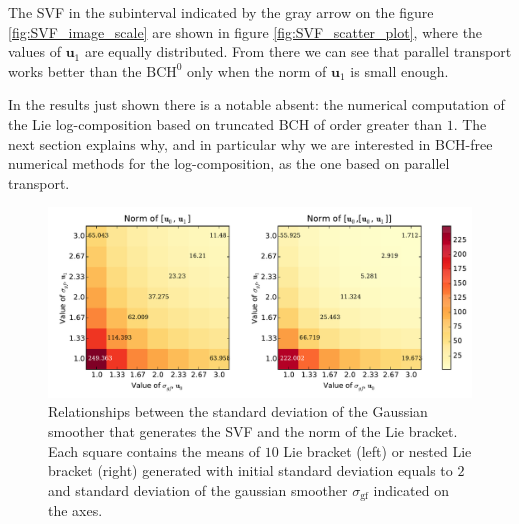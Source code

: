The SVF in the subinterval indicated by the gray arrow on the figure \ref{fig:SVF_image_scale} are shown in figure \ref{fig:SVF_scatter_plot}, where the values of $\mathbf{u}_1$ are equally distributed. From there we can see that parallel transport works better than the $\text{BCH}^0$ only when the norm of $\mathbf{u}_1$ is small enough.

In the results just shown there is a notable absent: the numerical computation of the Lie log-composition based on truncated BCH of order greater than $1$. The next section explains why, and in particular why we are interested in BCH-free numerical methods for the log-composition, as the one based on parallel transport.

\begin{figure}[!ht]
	\hspace{0cm}
	\includegraphics[scale=0.5]{figures/SVF_image_scale_bracket_versus_gaussian.pdf}
	\caption{Relationships between the standard deviation of the Gaussian smoother that generates the SVF and the norm of the Lie bracket. Each square contains the means of $10$ Lie bracket (left) or nested Lie bracket (right) generated with initial standard deviation equals to $2$ and standard deviation of the gaussian smoother $\sigma_{\text{gf}}$ indicated on the axes.}
	\label{fig:SVF_image_scale_bracket_versus_gaussian}
\end{figure}


